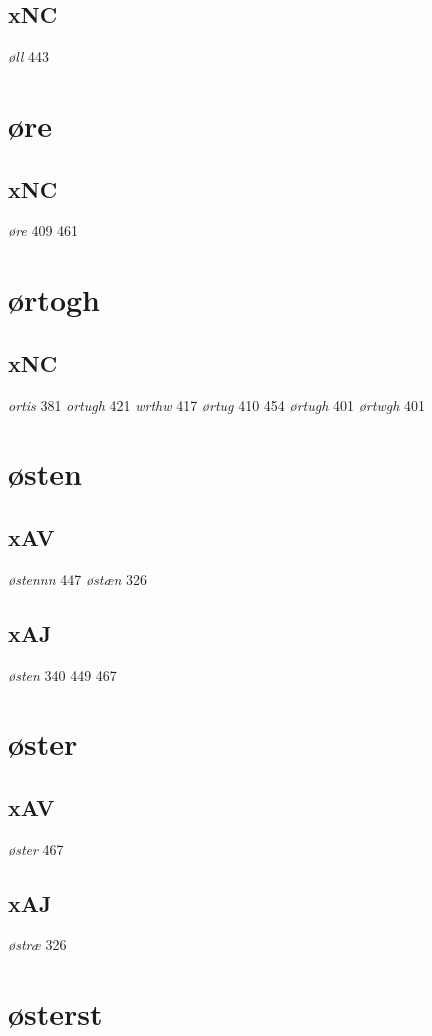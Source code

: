 \documentclass[a4paper,twocolumn]{article}
\begin{document}
\subsection{xNC}
\label{sec:orgb05111e}
\emph{øll} 443 
\section{øre}
\label{sec:org47fe16d}
\subsection{xNC}
\label{sec:org1fae993}
\emph{øre} 409 461 
\section{ørtogh}
\label{sec:orgfb1248f}
\subsection{xNC}
\label{sec:org16a8042}
\emph{ortis} 381 \emph{ortugh} 421 \emph{wrthw} 417 \emph{ørtug} 410 454 \emph{ørtugh} 401 \emph{ørtwgh} 401 
\section{østen}
\label{sec:org5ef6473}
\subsection{xAV}
\label{sec:org472b6cd}
\emph{østennn} 447 \emph{østæn} 326 
\subsection{xAJ}
\label{sec:org95d1d7f}
\emph{østen} 340 449 467 
\section{øster}
\label{sec:org3cb60a7}
\subsection{xAV}
\label{sec:org73e2519}
\emph{øster} 467 
\subsection{xAJ}
\label{sec:org19da968}
\emph{østræ} 326 
\section{østerst}
\label{sec:org891fbce}
\end{document}
